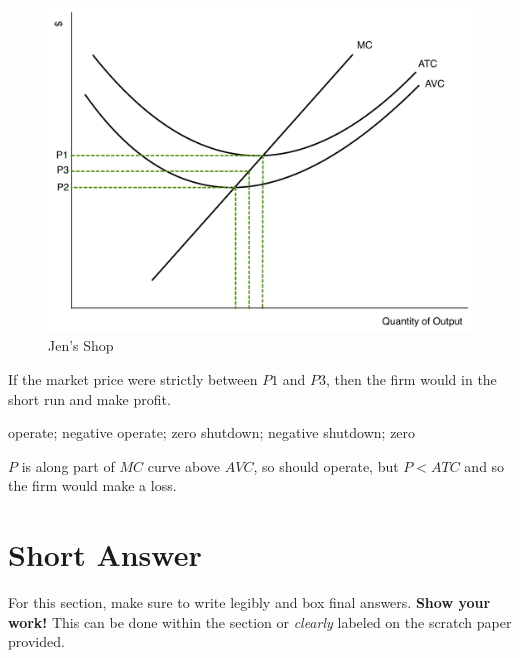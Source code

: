 \documentclass[addpoints,11pt]{exam}
\theoremstyle{definition}
\newcommand{\blank}[0]{\underline{\hspace{3cm}}}
\begin{document}
\begin{questions}
	\begin{figure}[H]
		\centering
		\includegraphics[scale=.37]{Exam1_MC27.pdf}
		\caption{Jen's Shop}
		\label{MC28}
	\end{figure}
	
	If the market price were strictly between $P1$ and $P3$, then the firm would \blank in the short run and make \blank profit.
	
	\begin{choices}
		\CorrectChoice operate; negative
		\choice operate; zero
		\choice shutdown; negative
		\choice shutdown; zero
	\end{choices}
	
	\begin{solution}
		$P$ is along part of $MC$ curve above $AVC$, so should operate, but $P < ATC$ and so the firm would make a loss.
	\end{solution}
	
\end{questions}

\newpage

\section*{Short Answer}

For this section, make sure to write legibly and box final answers. \textbf{Show your work!} This can be done within the section or \textit{clearly} labeled on the scratch paper provided.
\end{document}
